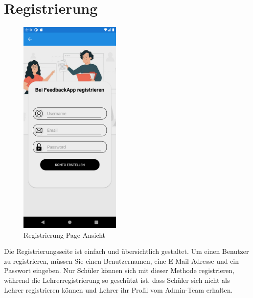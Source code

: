 \section{Registrierung}
\begin{figure}[h]
    \begin{center}
        \includegraphics[width=5cm]{pics/Xamarin Student/2 Registration Page.png}
        \caption[Registrierung Ansicht]{Registrierung Page Ansicht}
    \end{center}
\end{figure}
Die Registrierungsseite ist einfach und übersichtlich gestaltet. Um einen Benutzer zu registrieren, müssen Sie einen Benutzernamen, eine E-Mail-Adresse und ein Passwort eingeben. Nur Schüler können sich mit dieser Methode registrieren, während die Lehrerregistrierung so geschützt ist, dass Schüler sich nicht als Lehrer registrieren können und Lehrer ihr Profil vom Admin-Team erhalten.
\newpage
